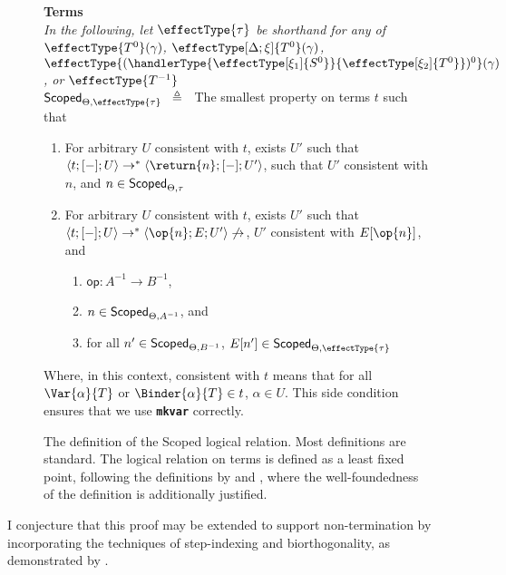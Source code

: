 \begin{figure}
\begin{source-desc}
\textbf{Terms}\\
{\scriptsize{\textit{In the following, let $\effectType{\tau}$ be shorthand for any of $\effectType{T^{0}} (\gamma)$, $\effectType[\Delta; \xi]{T^{0}} (\gamma)$, $\effectType{(\handlerType{\effectType[\xi_1]{S^0}}{\effectType[\xi_2]{T^0}})^{0}} (\gamma)$, or $\effectType{T^{-1}}$}}}\\

$\scoped{\effectType{\tau}} \hspace{2mm} \triangleq \hspace{2mm}$ The smallest property on terms $t$ such that 
\begin{enumerate}
  \item For arbitrary $U$ consistent with $t$, exists $U'$ such that $\langle t;[-];U \rangle \to^{*} \langle \return{n}; [-]; U' \rangle$, such that $U'$ consistent with $n$, and $n \in \textsf{Scoped}_{{\Theta}, {\tau}}$ 
  \item For arbitrary $U$ consistent with $t$, exists $U'$ such that $\langle t;[-];U \rangle \to^{*} \langle \op{n}; E; U' \rangle \not\to$, $U'$ consistent with $E[\op{n}]$, and 
  \begin{enumerate}
    \item $\textsf{op}: A^{-1} \to B^{-1}$,
    \item $n \in \textsf{Scoped}_{{\Theta}, {A^{-1}}}$, and 
    \item for all $n' \in \textsf{Scoped}_{{\Theta}, {B^{-1}}}$, $E[n'] \in \scoped{\effectType{\tau}}$
  \end{enumerate}
\end{enumerate}
Where, in this context, consistent with $t$ means that for all $\Var{\alpha}{T}$ or $\Binder{\alpha}{T} \in t$, $\alpha \in U$. This side condition ensures that we use \textbf{\texttt{mkvar}} correctly.
\end{source-desc}
\caption{The definition of the \textsf{Scoped} logical relation. Most definitions are standard. The logical relation on terms is defined as a least fixed point, following the definitions by \citet{plotkin-2025} and \citet{kuchta-2023}, where the well-foundedness of the definition is additionally justified.}
\label{fig:logical-relation-defn}
\end{figure}

I conjecture that this proof may be extended to support non-termination by incorporating the techniques of step-indexing and biorthogonality, as demonstrated by \citet{biernacki-2017}.

